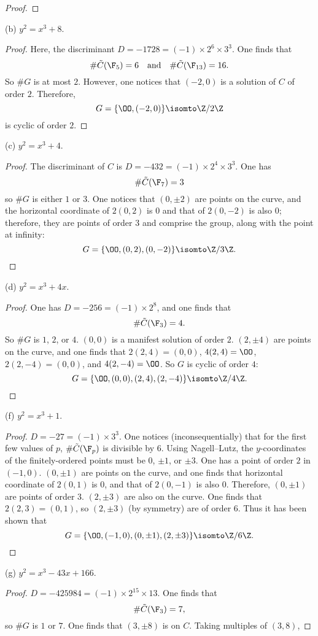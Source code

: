 \documentclass[11pt, oneside]{article}
\begin{document}
\begin{enumerate}
\begin{proof}
\end{proof}
(b) $y^2 = x^3 + 8$.
\begin{proof}
Here, the discriminant $D = -1728 = (-1)\times 2^6\times 3^3$. One finds that
$$
\# \tilde C(\F_5) = 6\quad\textrm{and}\quad\# \tilde C(\F_{13}) = 16.
$$
So $\# G$ is at most $2$. However, one notices that $(-2, 0)$ is a solution of $C$ of order $2$. Therefore,
$$
G = \{ \OO, (-2,0)\} \isomto \Z/2\Z
$$
is cyclic of order $2$.
\end{proof}
(c) $y^2 = x^3 + 4$.
\begin{proof}
The discriminant of $C$ is $D = -432 = (-1)\times 2^4\times 3^3$. One has
$$
\# \tilde C(\F_7) = 3
$$ 
so $\# G$ is either $1$ or $3$. One notices that $(0, \pm 2)$ are points on the curve, and the horizontal coordinate of $2(0,2)$ is $0$ and that of $2(0,-2)$ is also $0$; therefore, they are points of order $3$ and comprise the group, along with the point at infinity:
$$
G = \{\OO, (0,2), (0,-2)\} \isomto \Z/3\Z.
$$
\end{proof}
(d) $y^2 = x^3 + 4x$.
\begin{proof}
One has $D = -256 = (-1)\times 2^8$, and one finds that 
$$
\# \tilde C(\F_3) = 4.
$$
So $\# G$ is $1$, $2$, or $4$. $(0,0)$ is a manifest solution of order $2$. $(2,\pm 4)$ are points on the curve, and one finds that $2(2,4) = (0,0)$, $4(2,4) = \OO$, $2(2,-4) = (0,0)$, and $4(2,-4) = \OO$. So $G$ is cyclic of order $4$:
$$
G = \{\OO, (0,0), (2,4), (2,-4)\} \isomto \Z/4\Z.
$$
\end{proof}
(f) $y^2 = x^3 + 1$.
\begin{proof}
$D = -27 = (-1)\times 3^3$. One notices (inconsequentially) that for the first few values of $p$, $\#\tilde C (\F_p)$ is divisible by $6$. Using Nagell--Lutz, the $y$-coordinates of the finitely-ordered points must be $0$, $\pm 1$, or $\pm 3$. One has a point of order $2$ in $(-1, 0)$. $(0, \pm 1)$ are points on the curve, and one finds that horizontal coordinate of $2(0, 1)$ is $0$, and that of $2(0, -1)$ is also $0$. Therefore, $(0,\pm 1)$ are points of order $3$. $(2,\pm 3)$ are also on the curve. One finds that $2(2,3)=(0,1)$, so $(2,\pm 3)$ (by symmetry) are of order $6$. Thus it has been shown that
$$
G = \{\OO, (-1,0), (0,\pm1), (2,\pm 3)\} \isomto \Z/6\Z.
$$
\end{proof}
(g) $y^2 = x^3 -43x + 166$.
\begin{proof}
$D = -425984 = (-1)\times 2^{15} \times 13$. One finds that
$$
\# \tilde C(\F_3) = 7,
$$
so $\# G$ is $1$ or $7$. One finds that $(3,\pm 8)$ is on $C$. Taking multiples of $(3,8)$,

\end{proof}
\end{enumerate}
\end{document}
